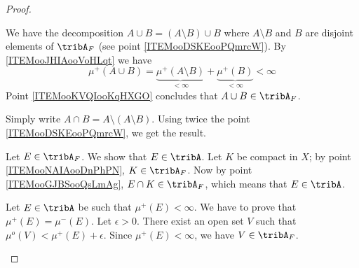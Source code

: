 \begin{proof}
\begin{subproof}

		We have the decomposition \( A\cup B=(A\setminus B)\cup B\) where \( A\setminus B\) and \( B\) are disjoint elements of \( \tribA_F\) (see point \ref{ITEMooDSKEooPQmrcW}). By \ref{ITEMooJHIAooVoHLqt} we have
		\begin{equation}
			\mu^+(A\cup B)=\underbrace{\mu^+(A\setminus B)}_{<\infty}+ \underbrace{\mu^+(B)}_{<\infty}<\infty
		\end{equation}
		Point \ref{ITEMooKVQIooKqHXGO} concludes that \( A\cup B\in \tribA_F\).

		     \label{ITEMooGJBSooQsLmAg}

		Simply write \( A\cap B=A\setminus(A\setminus B)\). Using twice the point \ref{ITEMooDSKEooPQmrcW}, we get the result.


		     \label{ITEMooPOJQooCwbpkE}

		Let \( E\in \tribA_F\). We show that \( E\in \tribA\). Let \( K\) be compact in \( X\); by point \ref{ITEMooNAIAooDnPhPN}, \( K\in\tribA_F\). Now by point \ref{ITEMooGJBSooQsLmAg}, \( E\cap K\in \tribA_F\), which means that \( E\in \tribA\).

		\spitem[\( \tribA_F=\{ E\in\tribA\tq \mu^+(E)<\infty \}\)]      \label{ITEMooNXZTooOyKbfy}

		Let \( E\in\tribA\) be such that \( \mu^+(E)<\infty\). We have to prove that \( \mu^+(E)=\mu^-(E)\). Let \( \epsilon>0\). There exist an open set \( V\) such that \( \mu^o(V)<\mu^+(E)+\epsilon\). Since \( \mu^+(E)<\infty\), we have \( V\in \tribA_F\).


\end{subproof}
\end{proof}
